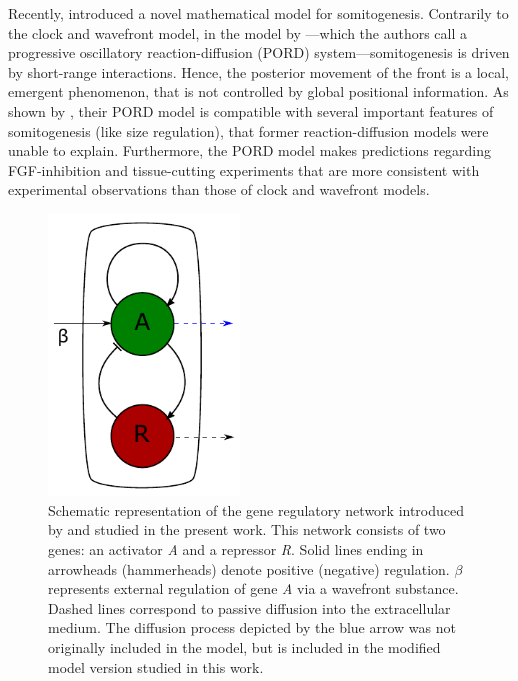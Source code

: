 \documentclass[11pt]{article}
\begin{document}
	Recently, \citet{Cotterell2015} introduced a novel mathematical model for
	somitogenesis. Contrarily to the clock and wavefront model, in the model by
	\citeauthor{Cotterell2015}---which the authors call a progressive oscillatory
	reaction-diffusion (PORD) system---somitogenesis is driven by short-range
	interactions. Hence, the posterior movement of the front is a local, emergent
	phenomenon, that is not controlled by global positional information. As shown by
	\citeauthor{Cotterell2015}, their PORD model is compatible with several
	important features of somitogenesis (like size regulation), that former
	reaction-diffusion models were unable to explain. Furthermore, the PORD model
	makes predictions regarding FGF-inhibition and tissue-cutting experiments that
	are more consistent with experimental observations than those of clock and
	wavefront models.
	
	\begin{figure}[t!]
		\centering
		\includegraphics[width=2in]{Figures/Fig01.pdf}
		\caption{Schematic representation of the gene regulatory network introduced by
			\citep{Cotterell2015} and studied in the present work. This network consists of
			two genes: an activator \textit{A} and a repressor \textit{R}. Solid lines
			ending in arrowheads (hammerheads) denote positive (negative) regulation.
			$\beta$ represents external regulation of gene \textit{A} via a wavefront
			substance. Dashed lines correspond to passive diffusion into the extracellular
			medium. The diffusion process depicted by the blue arrow was not
			originally included in the \citeauthor{Cotterell2015} model, but is 
			included in the modified model version studied in this work.}
		\label{Fig01}
	\end{figure}
	
\end{document}
